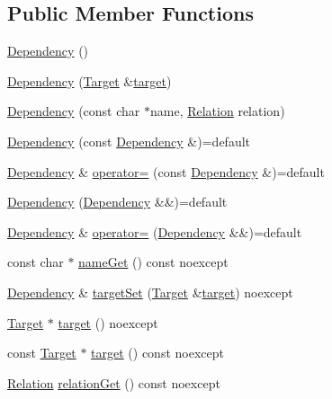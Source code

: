 \subsection*{Public Member Functions}
\begin{DoxyCompactItemize}
\item 
\hyperlink{class_maike_1_1_dependency_aa92957076c5000d1d3a56073302f1a41}{Dependency} ()
\item 
\hyperlink{class_maike_1_1_dependency_aaec77bca6441a19bd17a5d4c598597c3}{Dependency} (\hyperlink{class_maike_1_1_target}{Target} \&\hyperlink{class_maike_1_1_dependency_a80ef5cd5a250b6bcbf8425bedf7c4498}{target})
\item 
\hyperlink{class_maike_1_1_dependency_aad801e78c273acc7d8d228eb4ad27c56}{Dependency} (const char $\ast$name, \hyperlink{class_maike_1_1_dependency_a1b670303409ad2240f246e2a2c55d380}{Relation} relation)
\item 
\hyperlink{class_maike_1_1_dependency_ae8f606939c5f403c450ac453fdcd231a}{Dependency} (const \hyperlink{class_maike_1_1_dependency}{Dependency} \&)=default
\item 
\hyperlink{class_maike_1_1_dependency}{Dependency} \& \hyperlink{class_maike_1_1_dependency_ab14650c3df3a66c1003966e64ac7ad3d}{operator=} (const \hyperlink{class_maike_1_1_dependency}{Dependency} \&)=default
\item 
\hyperlink{class_maike_1_1_dependency_a8385a5d634240be722dca5ebf908c0c5}{Dependency} (\hyperlink{class_maike_1_1_dependency}{Dependency} \&\&)=default
\item 
\hyperlink{class_maike_1_1_dependency}{Dependency} \& \hyperlink{class_maike_1_1_dependency_a00da6c0f5d5b654a8d4412b90034655f}{operator=} (\hyperlink{class_maike_1_1_dependency}{Dependency} \&\&)=default
\item 
const char $\ast$ \hyperlink{class_maike_1_1_dependency_aa24f1895d1a46b19c33847f10d6cce12}{name\+Get} () const noexcept
\item 
\hyperlink{class_maike_1_1_dependency}{Dependency} \& \hyperlink{class_maike_1_1_dependency_a787830159fe8c1886e7d37881c26a905}{target\+Set} (\hyperlink{class_maike_1_1_target}{Target} \&\hyperlink{class_maike_1_1_dependency_a80ef5cd5a250b6bcbf8425bedf7c4498}{target}) noexcept
\item 
\hyperlink{class_maike_1_1_target}{Target} $\ast$ \hyperlink{class_maike_1_1_dependency_a80ef5cd5a250b6bcbf8425bedf7c4498}{target} () noexcept
\item 
const \hyperlink{class_maike_1_1_target}{Target} $\ast$ \hyperlink{class_maike_1_1_dependency_a702f6a338fdf2712b5fe697bb16b10fb}{target} () const noexcept
\item 
\hyperlink{class_maike_1_1_dependency_a1b670303409ad2240f246e2a2c55d380}{Relation} \hyperlink{class_maike_1_1_dependency_ad92e460b2e708a9ea0014cf80e0f80a1}{relation\+Get} () const noexcept
\end{DoxyCompactItemize}


